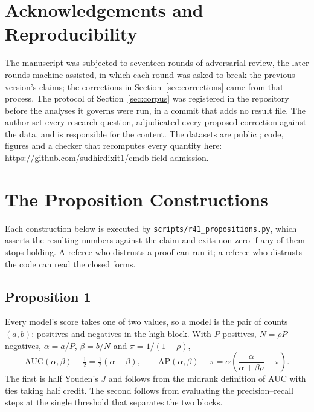 \documentclass[preprint,12pt]{elsarticle}
\begin{document}
\section*{Acknowledgements and Reproducibility}
The manuscript was subjected to seventeen rounds of adversarial review, the
later rounds machine-assisted, in which each round was asked to break the
previous version's claims; the corrections in Section~\ref{sec:corrections}
came from that process. The protocol of Section~\ref{sec:corpus} was
registered in the repository before the analyses it governs were run, in a
commit that adds no result file. The author set every research question, adjudicated
every proposed correction against the data, and is responsible for the
content. The datasets are public
\citep{vandongen2014bpic,steeman2013bpic}; code, figures and a checker that
recomputes every quantity here:
\url{https://github.com/sudhirdixit1/cmdb-field-admission}.





\appendix

\section{The Proposition Constructions}
\label{app:props}

Each construction below is executed by \texttt{scripts/r41\_propositions.py},
which asserts the resulting numbers against the claim and exits non-zero if
any of them stops holding. A referee who distrusts a proof can run it; a
referee who distrusts the code can read the closed forms.

\subsection*{Proposition 1}

Every model's score takes one of two values, so a model is the pair of counts
$(a,b)$: positives and negatives in the high block. With $P$ positives,
$N = \rho P$ negatives, $\alpha = a/P$, $\beta = b/N$ and
$\pi = 1/(1+\rho)$,
\[
  \mathrm{AUC}(\alpha,\beta) - \tfrac12 = \tfrac12(\alpha - \beta),
  \qquad
  \mathrm{AP}(\alpha,\beta) - \pi
    = \alpha\!\left(\frac{\alpha}{\alpha + \beta\rho} - \pi\right).
\]
The first is half Youden's $J$ and follows from the midrank definition of AUC
with ties taking half credit. The second follows from evaluating the
precision--recall steps at the single threshold that separates the two blocks.
\end{document}
